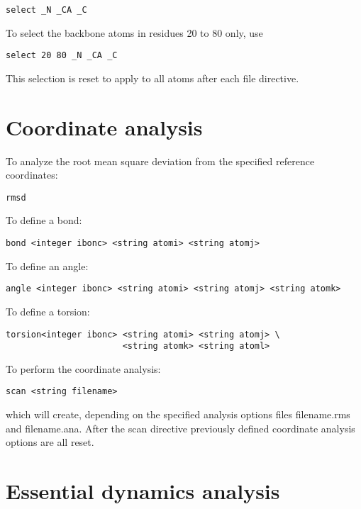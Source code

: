 \begin{verbatim}
select _N _CA _C
\end{verbatim}

To select the backbone atoms in residues 20 to 80 only, use

\begin{verbatim}
select 20 80 _N _CA _C
\end{verbatim}

This selection is reset to apply to all atoms after each file
directive.

\section{Coordinate analysis}

To analyze the root mean square deviation from the specified reference
coordinates:

\begin{verbatim}
rmsd
\end{verbatim}

To define a bond:

\begin{verbatim}
bond <integer ibonc> <string atomi> <string atomj> 
\end{verbatim}

To define an angle:

\begin{verbatim}
angle <integer ibonc> <string atomi> <string atomj> <string atomk> 
\end{verbatim}

To define a torsion:

\begin{verbatim}
torsion<integer ibonc> <string atomi> <string atomj> \
                       <string atomk> <string atoml> 
\end{verbatim}

To perform the coordinate analysis:

\begin{verbatim}
scan <string filename>
\end{verbatim}

which will create, depending on the specified analysis options
files filename.rms and filename.ana. After the scan directive
previously defined coordinate analysis options are all reset.

\section{Essential dynamics analysis}

